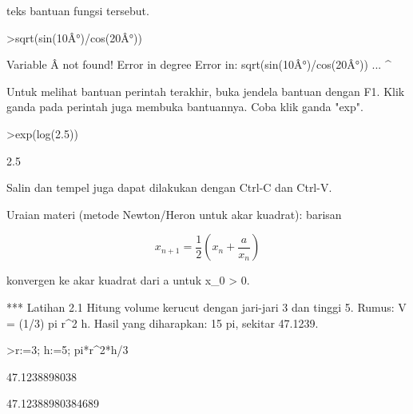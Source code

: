 \documentclass[a4paper,10pt]{article}
\begin{document}
\begin{eulernotebook}
\begin{eulercomment}
teks bantuan fungsi tersebut.
\end{eulercomment}
\begin{eulerprompt}
>sqrt(sin(10Â°)/cos(20Â°))
\end{eulerprompt}
\begin{euleroutput}
  Variable Â not found!
  Error in degree
  Error in:
  sqrt(sin(10Â°)/cos(20Â°)) ...
               ^
\end{euleroutput}
\begin{eulercomment}
Untuk melihat bantuan perintah terakhir, buka jendela bantuan dengan F1.
Klik ganda pada perintah juga membuka bantuannya. Coba klik ganda "exp".
\end{eulercomment}
\begin{eulerprompt}
>exp(log(2.5))
\end{eulerprompt}
\begin{euleroutput}
  2.5
\end{euleroutput}
\begin{eulercomment}
Salin dan tempel juga dapat dilakukan dengan Ctrl-C dan Ctrl-V.
\end{eulercomment}
\begin{eulercomment}

Uraian materi (metode Newton/Heron untuk akar kuadrat): barisan

\end{eulercomment}
\begin{eulerformula}
\[
x_{n+1}=\frac{1}{2}\left(x_n+\frac{a}{x_n}\right)
\]
\end{eulerformula}
\begin{eulercomment}
konvergen ke akar kuadrat dari a untuk x\_0 \textgreater{} 0.

*** Latihan 2.1
Hitung volume kerucut dengan jari-jari 3 dan tinggi 5.
Rumus: V = (1/3) pi r\textasciicircum{}2 h. Hasil yang diharapkan: 15 pi, sekitar 47.1239.
\end{eulercomment}
\begin{eulerprompt}
>r:=3; h:=5; pi*r^2*h/3
\end{eulerprompt}
\begin{euleroutput}
  47.1238898038
\end{euleroutput}
\begin{euleroutput}
  
                            47.12388980384689
  

\end{euleroutput}
\end{eulernotebook}
\end{document}
